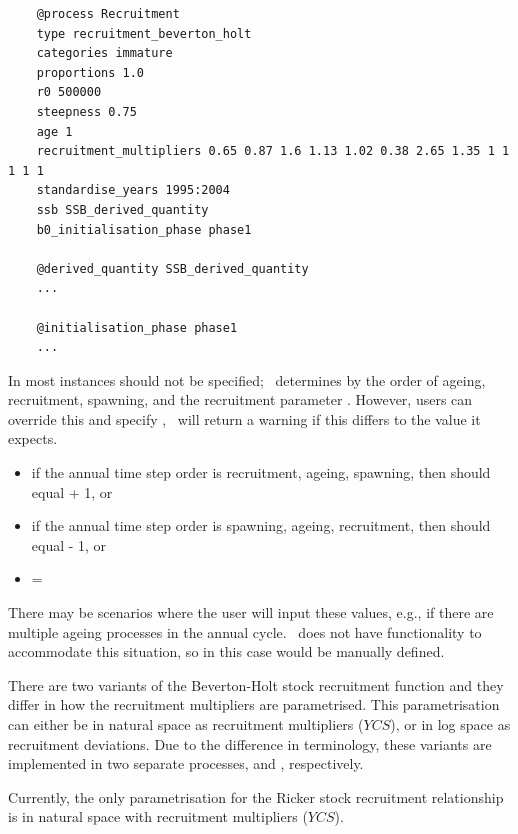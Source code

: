 {\small{\begin{verbatim}
	@process Recruitment
	type recruitment_beverton_holt
	categories immature
	proportions 1.0
	r0 500000
	steepness 0.75
	age 1
	recruitment_multipliers 0.65 0.87 1.6 1.13 1.02 0.38 2.65 1.35 1 1 1 1 1
	standardise_years 1995:2004
	ssb SSB_derived_quantity
	b0_initialisation_phase phase1
	
	@derived_quantity SSB_derived_quantity
	...
	
	@initialisation_phase phase1
	...
\end{verbatim}}}

In most instances  should not be specified; \CNAME\ determines  by the order of ageing, recruitment, spawning, and the recruitment parameter . However, users can override this and specify , \CNAME\ will return a warning if this differs to the value it expects.

\begin{itemize}
	\item if the annual time step order is recruitment, ageing, spawning, then  should equal  + 1, or
	\item if the annual time step order is spawning, ageing, recruitment, then  should equal  - 1, or
	\item {} = 
\end{itemize}

There may be scenarios where the user will input these values, e.g., if there are multiple ageing processes in the annual cycle. \CNAME\ does not have functionality to accommodate this situation, so in this case  would be manually defined.

There are two variants of the Beverton-Holt stock recruitment function and they differ in how the recruitment multipliers are parametrised. This parametrisation can either be in natural space as recruitment multipliers ($YCS$), or in log space as recruitment deviations. Due to the difference in terminology, these variants are implemented in two separate processes,  and , respectively.

Currently, the only parametrisation for the Ricker stock recruitment relationship is in natural space with recruitment multipliers ($YCS$).

